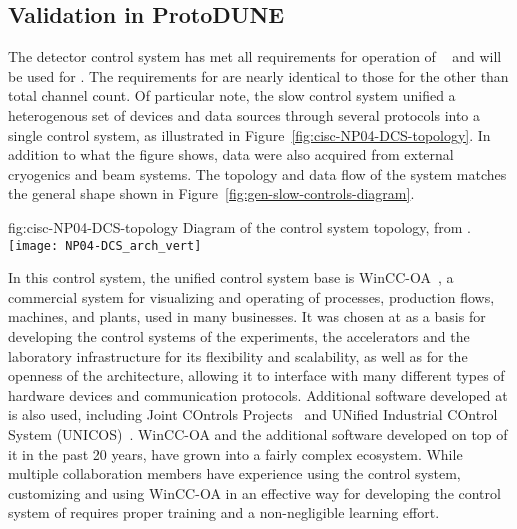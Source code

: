\subsection{Validation in ProtoDUNE}
\label{sec:cisc-slow-control-pdsp}

The  detector control system has met
all requirements for operation of ~\cite{pdspdcs_proc} and will be used for . The requirements for  are
nearly identical to those for the  other than
total channel count. Of particular note, the  slow control system unified a heterogenous set of devices and data sources
through several protocols into a
single control system, as illustrated in
Figure~\ref{fig:cisc-NP04-DCS-topology}. In addition to what
the figure shows, data were also acquired from external cryogenics and beam
systems.  The topology and data flow of the system matches the general
shape shown in Figure~\ref{fig:gen-slow-controls-diagram}.

\begin{dunefigure}{fig:cisc-NP04-DCS-topology}
{Diagram of the  control system topology, from \cite{pdspdcs_proc}.}
\texttt{[image: NP04-DCS\_arch\_vert]}
\end{dunefigure}

In this control system, the unified control system base is WinCC-OA~\cite{winccoa}, a commercial  system for visualizing and operating of processes, production flows, machines, and plants, used
in many businesses. It was chosen at  as a basis for
developing the control systems of the  experiments, the
accelerators and the laboratory infrastructure for its flexibility and
scalability, as well as for the openness of the architecture, allowing
it to interface with many different types of hardware devices and
communication protocols. Additional software developed at 
is also used, including Joint COntrols Projects~\cite{jcop} and UNified
Industrial COntrol System (UNICOS)~\cite{unicos}. WinCC-OA and the
additional software developed on top of it in the past 20 years, have
grown into a fairly complex ecosystem. While multiple collaboration
members have experience using the  control system,
customizing and using WinCC-OA in an effective way for developing the
control system of  requires proper training and a
non-negligible learning effort.

